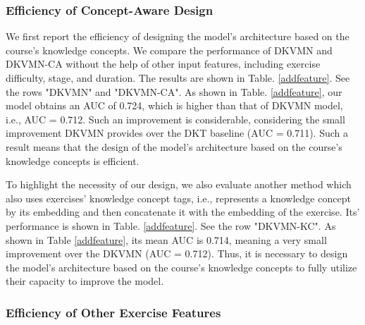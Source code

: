 \documentclass{edm_template}
\begin{document}
\subsubsection{Efficiency of Concept-Aware Design}

We first report the efficiency of designing the model's architecture based on the course's knowledge concepts. We compare the performance of DKVMN and DKVMN-CA without the help of other input features, including exercise difficulty, stage, and duration. The results are shown in Table. \ref{addfeature}. See the rows "DKVMN" and "DKVMN-CA". As shown in Table. \ref{addfeature}, our model obtains an AUC of 0.724, which is higher than that of DKVMN model, i.e., AUC = 0.712. Such an improvement is considerable, considering the small improvement DKVMN provides over the DKT baseline (AUC = 0.711). Such a result means that the design of the model's architecture based on the course's knowledge concepts is efficient.

To highlight the necessity of our design, we also evaluate another method which also uses exercises' knowledge concept tags, i.e., represents a knowledge concept by its embedding and then concatenate it with the embedding of the exercise. Its' performance is shown in Table. \ref{addfeature}. See the row "DKVMN-KC". As shown in Table \ref{addfeature}, its mean AUC is 0.714, meaning a very small improvement over the DKVMN (AUC = 0.712). Thus, it is necessary to design the model's architecture based on the course's knowledge concepts to fully utilize their capacity to improve the model.


\subsubsection{Efficiency of Other Exercise Features}

\end{document}
